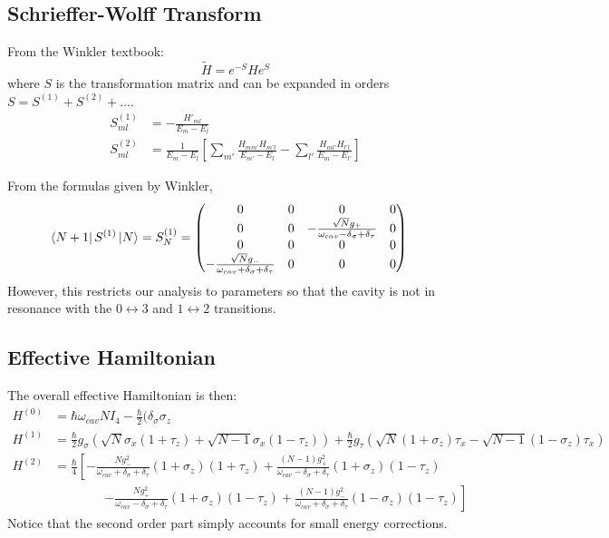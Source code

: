 \documentclass[
    preprint,
    amsmath,amssymb,
    aps,
    prb,
    floatfix,
]{revtex4-2}
\begin{document}
    \subsection{Schrieffer-Wolff Transform}
        \begin{framed}
            From the Winkler textbook:
            \begin{equation}
                \tilde{H} = e^{-S}He^{S}
            \end{equation}
            where $S$ is the transformation matrix and can be expanded in orders $S = S^{(1)} + S^{(2)} + \dots$.
            \begin{align}
                S^{(1)}_{ml} &= -\frac{H'_{ml}}{E_m-E_l}\\
                S^{(2)}_{ml} &= \frac{1}{E_m-E_l}\left[ \sum_{m'}\frac{H_{mm'}H_{m'l}}{E_{m'}-E_l}-\sum_{l'}\frac{H_{ml'}H_{l'l}}{E_m-E_{l'}} \right]
            \end{align}
        \end{framed}
        From the formulas given by Winkler,
        \begin{align}
            \bra{N+1}S^{(1)}\ket{N} &= S_N^{(1)} = \begin{pmatrix}
                0 & 0 & 0 & 0 \\
                0 & 0 & -\frac{\sqrt{N}g_+}{\omega_{cav}-\delta_\sigma+\delta_\tau} & 0 \\
                0 & 0 & 0 & 0 \\
                -\frac{\sqrt{N}g_-}{\omega_{cav}+\delta_\sigma+\delta_\tau} & 0 & 0 & 0
            \end{pmatrix}
        \end{align}
        However, this restricts our analysis to parameters so that the cavity is not in resonance with the $0\leftrightarrow3$ and $1\leftrightarrow2$ transitions.
    \subsection{Effective Hamiltonian}
        The overall effective Hamiltonian is then:
        \begin{align}
            H^{(0)} &= \hbar\omega_{cav}NI_4-\frac{\hbar}{2}(\delta_\sigma\sigma_z \\
            H^{(1)} &= \frac{\hbar}{2}g_\sigma\left(\sqrt{N}\sigma_x(1+\tau_z)+\sqrt{N-1}\sigma_x(1-\tau_z)\right)+\frac{\hbar}{2}g_\tau\left(\sqrt{N}(1+\sigma_z)\tau_x-\sqrt{N-1}(1-\sigma_z)\tau_x\right) \\
            H^{(2)} &= \frac{\hbar}{4}\left[ -\frac{Ng_-^2}{\omega_{cav}+\delta_\sigma+\delta_\tau}(1+\sigma_z)(1+\tau_z) +\frac{(N-1)g_+^2}{\omega_{cav}-\delta_\sigma+\delta_\tau}(1+\sigma_z)(1-\tau_z) \right.\nonumber\\
            &\qquad\qquad\left. -\frac{Ng_+^2}{\omega_{cav}-\delta_\sigma+\delta_\tau}(1+\sigma_z)(1-\tau_z)+\frac{(N-1)g_-^2}{\omega_{cav}+\delta_\sigma+\delta_\tau}(1-\sigma_z)(1-\tau_z) \right]
        \end{align}
        Notice that the second order part simply accounts for small energy corrections.
\end{document}
